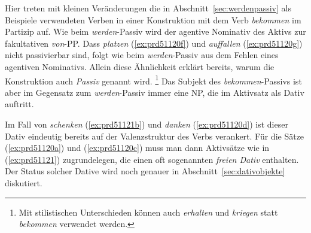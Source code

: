 \begin{exe}
  \ex\label{ex:prd51120} 
  \begin{xlist}
  \end{xlist}
\end{exe}

Hier treten mit kleinen Veränderungen die in Abschnitt~\ref{sec:werdenpassiv} als Beispiele verwendeten Verben in einer Konstruktion mit dem Verb \textit{bekommen} im Partizip auf.
Wie beim \textit{werden}-Passiv wird der agentive Nominativ des Aktivs zur fakultativen \textit{von}-PP.
Dass \textit{platzen} (\ref{ex:prd51120f}) und \textit{auffallen} (\ref{ex:prd51120g}) nicht passivierbar sind, folgt wie beim \textit{werden}-Passiv aus dem Fehlen eines agentiven Nominativs.
Allein diese Ähnlichkeit erklärt bereits, warum die Konstruktion auch \textit{Passiv} genannt wird.%
\footnote{Mit stilistischen Unterschieden können auch \textit{erhalten} und \textit{kriegen} statt \textit{bekommen} verwendet werden.}
Das Subjekt des \textit{bekommen}-Passivs ist aber im Gegensatz zum \textit{werden}-Passiv immer eine NP, die im Aktivsatz als Dativ auftritt.


Im Fall von \textit{schenken} (\ref{ex:prd51121b}) und \textit{danken} (\ref{ex:prd51120d}) ist dieser Dativ eindeutig bereits auf der Valenzstruktur des Verbs verankert.
Für die Sätze (\ref{ex:prd51120a}) und (\ref{ex:prd51120c}) muss man dann Aktivsätze wie in (\ref{ex:prd51121}) zugrundelegen, die einen oft sogenannten \textit{freien Dativ} enthalten.
Der Status solcher Dative wird noch genauer in Abschnitt~\ref{sec:dativobjekte} diskutiert.

